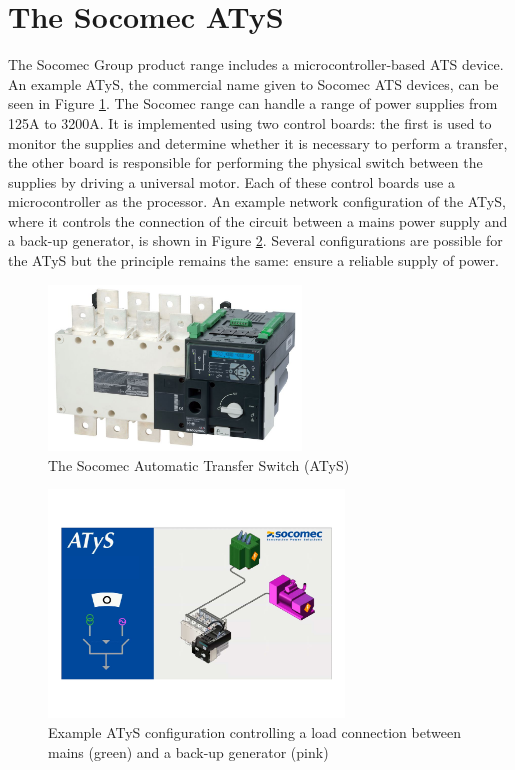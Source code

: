 \section{The Socomec ATyS}
The Socomec Group product range includes a microcontroller-based ATS device. An example ATyS, the commercial name given to Socomec ATS devices, can be seen in Figure \ref{AtysDevice}. The Socomec range can handle a range of power supplies from 125A to 3200A\cite{socomec_atys_range}. It is implemented using two control boards: the first is used to monitor the supplies and determine whether it is necessary to perform a transfer, the other board is responsible for performing the physical switch between the supplies by driving a universal motor. Each of these control boards use a microcontroller as the processor.
An example network configuration of the ATyS, where it controls the connection of the circuit between a mains power supply and a back-up generator, is shown in Figure \ref{AtysConfig}. Several configurations are possible for the ATyS but the principle remains the same: ensure a reliable supply of power.

\begin{figure}[h]
\centering
\includegraphics[width=0.6\textwidth]{images/ATySDevice.jpg}
\caption{The Socomec Automatic Transfer Switch (ATyS)\cite{socomec_atys}}
\label{AtysDevice}
\end{figure}


\begin{figure}[h]
\centering
\includegraphics[width=0.7\textwidth]{images/AtysConfig.pdf}
\caption{Example ATyS configuration controlling a load connection between mains (green) and a back-up generator (pink)\cite{socomec_atys_network}}
\label{AtysConfig}
\end{figure}


